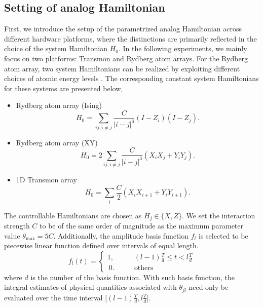 \documentclass[twocolumn,
pra,aps,superscriptaddress,showpacs,amsmath,amssymb]{revtex4-2}
\begin{document}
\subsection{Setting of analog Hamiltonian}
\label{sec:ansatzsetting}
First, we introduce the setup of the parametrized analog Hamiltonian across different hardware platforms, where the distinctions are primarily reflected in the choice of the system Hamiltonian $H_0$. In the following experiments, we mainly focus on two platforms: Transmon and Rydberg atom arrays. For the Rydberg atom array, two system Hamiltonians can be realized by exploiting different choices of atomic energy levels \cite{georgescu2014quantum}. The corresponding constant system Hamiltonians for these systems are presented below,
\begin{itemize}
\item Rydberg atom array (Ising)\\
\begin{equation}
H_0 = \sum_{ij,i\neq j}\frac{C}{|i-j|^6}(I-Z_i)(I-Z_j).
\end{equation}
\item Rydberg atom array (XY)\\
\begin{equation}
H_0=2\sum_{ij,i\neq j}\frac{C}{|i-j|^3}\left(X_iX_j+Y_iY_j\right).
\end{equation}
\item 1D Transmon array\\
\begin{equation}
H_0=\sum_{i}\frac{C}{2}(X_i X_{i+1}+Y_iY_{i+1}).
\end{equation}
\end{itemize}
The controllable Hamiltonians are chosen as $H_j \in \{X, Z\}$. We set the interaction strength $C$ to be of the same order of magnitude as the maximum parameter value $\theta_{\max}=5C$. Additionally, the amplitude basis function $f_l$ is selected to be piecewise linear function defined over intervals of equal length.
\begin{equation}
f_l(t) = 
\left\{
\begin{aligned}
1, \qquad  & (l-1)\frac{T}{d} \leq t<l\frac{T}{d}  \\\
0. \qquad   & \textrm{others}
\end{aligned}
\right.
\end{equation}
where $d$ is the number of the basis function. With such basis function, the integral estimates of physical quantities associated with $\theta_{jl}$ need only be evaluated over the time interval $\big[(l-1)\tfrac{T}{d}, l\tfrac{T}{d}\big]$.
\end{document}
